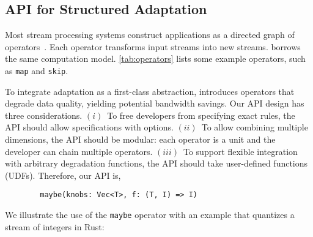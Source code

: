 \subsection{API for Structured Adaptation}
\label{sec:structure-adapt}

Most stream processing systems construct applications as a directed graph of
operators~\cite{toshniwal2014storm, zaharia2013discretized}. Each operator
transforms input streams into new streams. \sysname{} borrows the same
computation model.  \autoref{tab:operators} lists some example operators, such
as \texttt{map} and \texttt{skip}.

To integrate adaptation as a first-class abstraction, \sysname{} introduces
\maybe{} operators that degrade data quality, yielding potential bandwidth
savings.  Our API design has three considerations. $(i)$~To free developers from
specifying exact rules, the API should allow specifications with
options. $(ii)$~To allow combining multiple dimensions, the API should be
modular: each operator is a unit and the developer can chain multiple
operators. $(iii)$~To support flexible integration with arbitrary degradation
functions, the API should take user-defined functions (UDFs). Therefore, our API
is,

\vspace{-2pt}
\begin{lstlisting}
        maybe(knobs: Vec<T>, f: (T, I) => I)
\end{lstlisting}

We illustrate the use of the \texttt{maybe} operator with an example that
quantizes a stream of integers in Rust:

